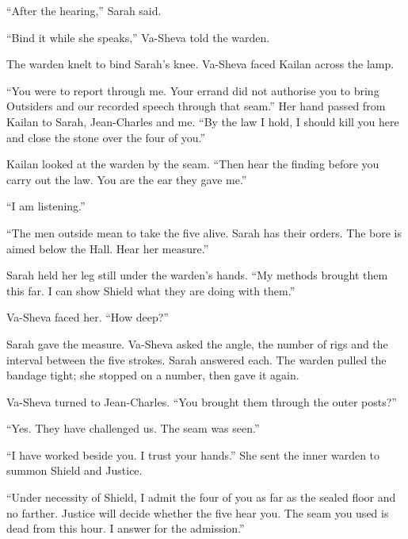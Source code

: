 ``After the hearing,'' Sarah said.\par

``Bind it while she speaks,'' Va-Sheva told the warden.\par

The warden knelt to bind Sarah's knee. Va-Sheva faced Kailan across the lamp.\par

``You were to report through me. Your errand did not authorise you to bring Outsiders and our recorded speech through that seam.'' Her hand passed from Kailan to Sarah, Jean-Charles and me. ``By the law I hold, I should kill you here and close the stone over the four of you.''\par

Kailan looked at the warden by the seam. ``Then hear the finding before you carry out the law. You are the ear they gave me.''\par

``I am listening.''\par

``The men outside mean to take the five alive. Sarah has their orders. The bore is aimed below the Hall. Hear her measure.''\par

Sarah held her leg still under the warden's hands. ``My methods brought them this far. I can show Shield what they are doing with them.''\par

Va-Sheva faced her. ``How deep?''\par

Sarah gave the measure. Va-Sheva asked the angle, the number of rigs and the interval between the five strokes. Sarah answered each. The warden pulled the bandage tight; she stopped on a number, then gave it again.\par

Va-Sheva turned to Jean-Charles. ``You brought them through the outer posts?''\par

``Yes. They have challenged us. The seam was seen.''\par

``I have worked beside you. I trust your hands.'' She sent the inner warden to summon Shield and Justice.\par

``Under necessity of Shield, I admit the four of you as far as the sealed floor and no farther. Justice will decide whether the five hear you. The seam you used is dead from this hour. I answer for the admission.''\par

